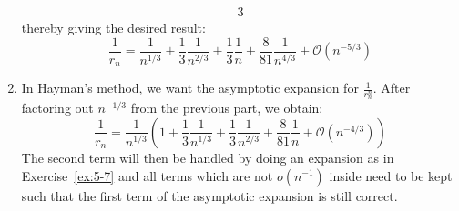 \begin{solution}
\begin{enumerate}[label=(\alph*)]
\begin{alignat*}{3}
        \end{alignat*}
        thereby giving the desired result:
        \[
            \frac{1}{r_n} = \frac{1}{n^{1/3}} + \frac{1}{3}\frac{1}{n^{2/3}}+\frac{1}{3}\frac{1}{n}+\frac{8}{81}\frac{1}{n^{4/3}}+ \mathcal{O}(n^{-5/3})
        \]
        \item In Hayman's method, we want the asymptotic expansion for $\frac{1}{r_n^n}$. After factoring out $n^{-1/3}$ from the previous part, we obtain:
        \[
            \frac{1}{r_n} = \frac{1}{n^{1/3}} \left(1 + \frac{1}{3}\frac{1}{n^{1/3}}+\frac{1}{3}\frac{1}{n^{2/3}}+\frac{8}{81}\frac{1}{n}+ \mathcal{O}(n^{-4/3})\right)
        \]
        The second term will then be handled by doing an expansion as in Exercise~\ref{ex:5-7} and all terms which are not $o(n^{-1})$ inside need to be kept such that the first term of the asymptotic expansion is still correct.


\end{enumerate}
\end{solution}
